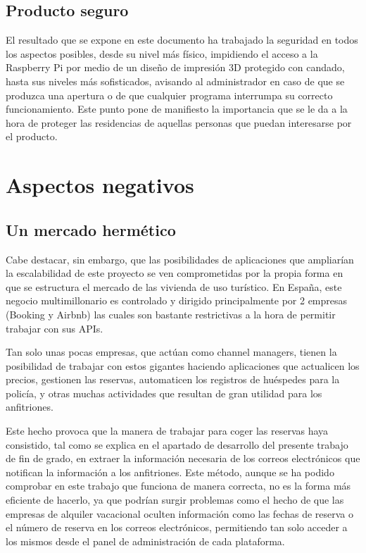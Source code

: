 \subsection{Producto seguro}
El resultado que se expone en este documento ha trabajado la seguridad en todos los aspectos posibles, desde su nivel más físico, impidiendo el acceso a la Raspberry Pi por medio de un diseño de impresión 3D protegido con candado, hasta sus niveles más sofisticados, avisando al administrador en caso de que se produzca una apertura o de que cualquier programa interrumpa su correcto funcionamiento. Este punto pone de manifiesto la importancia que se le da a la hora de proteger las residencias de aquellas personas que puedan interesarse por el producto.
\section{Aspectos negativos}
\subsection{Un mercado hermético}
Cabe destacar, sin embargo, que las posibilidades de aplicaciones que ampliarían la escalabilidad de este proyecto se ven comprometidas por la propia forma en que se estructura el mercado de las vivienda de uso turístico. En España, este negocio multimillonario es controlado y dirigido principalmente por 2 empresas (Booking y Airbnb) las cuales son bastante restrictivas a la hora de permitir trabajar con sus APIs.

Tan solo unas pocas empresas, que actúan como channel managers, tienen la posibilidad de trabajar con estos gigantes haciendo aplicaciones que actualicen los precios, gestionen las reservas, automaticen los registros de huéspedes para la policía, y otras muchas actividades que resultan de gran utilidad para los anfitriones. 

Este hecho provoca que la manera de trabajar para coger las reservas haya consistido, tal como se explica en el apartado de desarrollo del presente trabajo de fin de grado, en extraer la información necesaria de los correos electrónicos que notifican la información a los anfitriones. Este método, aunque se ha podido comprobar en este trabajo que funciona de manera correcta, no es la forma más eficiente de hacerlo, ya que podrían surgir problemas como el hecho de que las empresas de alquiler vacacional oculten información como las fechas de reserva o el número de reserva en los correos electrónicos, permitiendo tan solo acceder a los mismos desde el panel de administración de cada plataforma.

